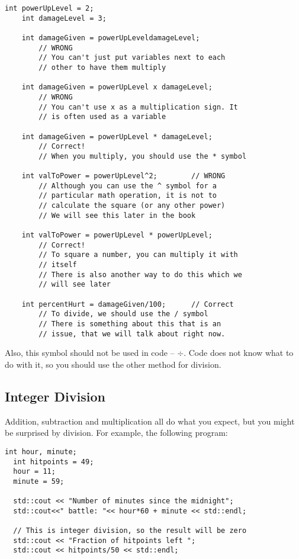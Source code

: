 \begin{lstlisting}[frame=single]
    int powerUpLevel = 2;
    int damageLevel = 3;
    
    int damageGiven = powerUpLeveldamageLevel;   
        // WRONG 
        // You can't just put variables next to each 
        // other to have them multiply
        
    int damageGiven = powerUpLevel x damageLevel;  
        // WRONG 
        // You can't use x as a multiplication sign. It 
        // is often used as a variable
        
    int damageGiven = powerUpLevel * damageLevel; 
        // Correct!
        // When you multiply, you should use the * symbol
    
    int valToPower = powerUpLevel^2;        // WRONG
        // Although you can use the ^ symbol for a 
        // particular math operation, it is not to 
        // calculate the square (or any other power)
        // We will see this later in the book
        
    int valToPower = powerUpLevel * powerUpLevel; 
        // Correct! 
        // To square a number, you can multiply it with
        // itself
        // There is also another way to do this which we
        // will see later
        
    int percentHurt = damageGiven/100;      // Correct
        // To divide, we should use the / symbol
        // There is something about this that is an 
        // issue, that we will talk about right now.
\end{lstlisting}
%
Also, this symbol should not be used in code -- $\div$. Code does not know what to do with it, so you should use the other method for division.

\subsection{Integer Division}
Addition, subtraction and multiplication all do what you
expect, but you might be surprised by division.  For example,
the following program:

\begin{lstlisting}[frame=single]
  int hour, minute;
  int hitpoints = 49;
  hour = 11;
  minute = 59;
  
  std::cout << "Number of minutes since the midnight";
  std::cout<<" battle: "<< hour*60 + minute << std::endl;

  // This is integer division, so the result will be zero
  std::cout << "Fraction of hitpoints left ";
  std::cout << hitpoints/50 << std::endl;
\end{lstlisting}
%

